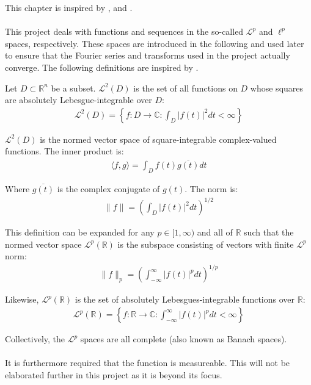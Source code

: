 This chapter is inspired by \cite{FAA}, \cite{FSP} and \cite{FTFA}.
\\ \\
This project deals with functions and sequences in the so-called $\mathcal{L}^p$ and $\ell^p$ spaces, respectively. These spaces are introduced in the following and used later to ensure that the Fourier series and transforms used in the project actually converge. The following definitions are inspired by \cite{page 31, FSP}.

\begin{definition}
Let $D \subset \mathbb{R}^n$ be a subset. $\mathcal{L}^2(D)$ is the set of all functions on $D$ whose squares are absolutely Lebesgue-integrable over $D$:
\begin{align*}
\mathcal{L}^2(D) = \left\{ f: D \to \mathbb{C}: \int_D |f(t)|^2 dt < \infty \right\}
\end{align*}

$\mathcal{L}^2(D)$ is the normed vector space of square-integrable complex-valued functions. The inner product is:
\begin{align*}
\langle f,g \rangle =  \int_D f(t) \overline{g(t)} dt
\end{align*}

Where $\overline{g(t)}$ is the complex conjugate of $g(t)$. The norm is:
\begin{align*}
\|f\| = \left( \int_D |f(t)|^2 dt \right)^{1/2}
\end{align*}

This definition can be expanded for any $p \in [1,\infty)$ and all of $\mathbb{R}$ such that the normed vector space $\mathcal{L}^p(\mathbb{R})$ is the subspace consisting of vectors with finite $\mathcal{L}^p$ norm:
\begin{align*}
\|f\|_p = \left( \int_{-\infty}^\infty |f(t)|^p dt \right)^{1/p}
\end{align*}

Likewise, $\mathcal{L}^p(\mathbb{R})$ is the set of absolutely Lebesgues-integrable functions over $\mathbb{R}$:
\begin{align*}
\mathcal{L}^p(\mathbb{R}) = \left\{ f: \mathbb{R} \to \mathbb{C}: \int_{-\infty}^\infty |f(t)|^p dt < \infty \right\}
\end{align*}

Collectively, the $\mathcal{L}^p$ spaces are all complete (also known as Banach spaces).
\\ \\
It is furthermore required that the function is measureable. This will not be elaborated further in this project as it is beyond its focus.
\end{definition}

